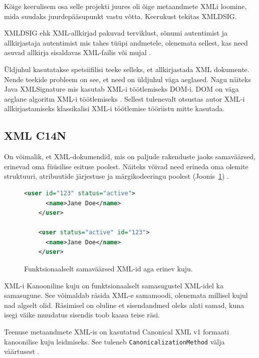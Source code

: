 Kõige keerulisem osa selle projekti juures oli õige metaandmete XMLi loomine,
mida suudaks juurdepääsupunkt vastu võtta. Keerukust tekitas XMLDSIG.

XMLDSIG ehk XML-allkirjad pakuvad terviklust, sõnumi autentimist ja allkirjastaja autentimist
mis tahes tüüpi andmetele, olenemata sellest, kas need asuvad allkirja sisaldavas 
XML-failis või mujal \cite{w3c_xmldsig_core1}. 

Üldjuhul kasutatakse spetsiifilisi teeke selleks, et allkirjastada XML dokumente.
Nende teekide probleem on see, et need on üldjuhul väga aeglased. Nagu näiteks Java
XMLSignature mis kasutab XML-i töötlemiseks DOM-i. DOM on väga aeglane algoritm XML-i
töötlemiseks \cite{ximpleware_benchmark_2003}. Sellest tulenevalt otsustas autor
XML-i allkirjastamiseks klassikalisi XML-i töötlemise tööriistu mitte kasutada.


\subsection{XML C14N}
On võimalik, et XML-dokumendid, mis on paljude rakenduste jaoks samaväärsed, 
erinevad oma füüsilise esituse poolest. Näiteks võivad need erineda oma olemite
struktuuri, atribuutide järjestuse ja märgikodeeringu poolest 
(Joonis~\ref{same-xml-different-form}) \cite{w3c_xml_c14n11}.


\begin{figure}[H]
  \centering

  \begin{lstlisting}[language=xml, frame=single, basicstyle=\small, breaklines=true]
    <user id="123" status="active">
      <name>Jane Doe</name>
    </user>

    <user status="active" id="123">
      <name>Jane Doe</name>
    </user>
  \end{lstlisting}

  \caption{Funktsionaalselt samaväärsed XML-id aga erinev kuju.}
  \label{same-xml-different-form}
\end{figure}

XML-i Kanooniline kuju on funktsionaalselt samasugustel XML-idel ka samasugune.
See võimaldab räsida XML-e samamoodi, olenemata millisel kujul nad algselt olid.
Räsimisel on oluline et sisendandmed oleks alati samad, kuna isegi väike muudatus 
sisendis toob kaasa teise räsi.

Teenuse metaandmete XML-is on kasutatud Canonical XML v1 formaati kanoonilise
kuju leidmiseks. See tuleneb \texttt{CanonicalizationMethod} välja
\texttt{} väärtusest 
\cite{w3c_xml_c14n_2001}.

